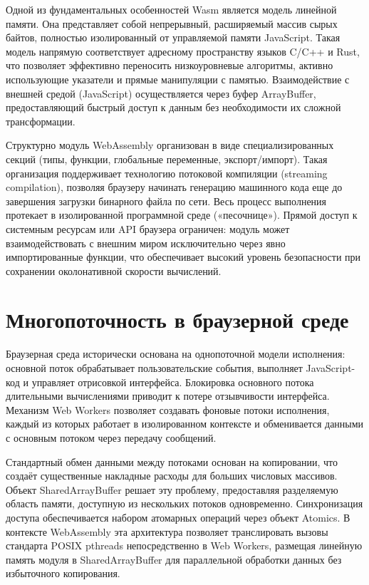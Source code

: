 \documentclass[12pt, oneside]{book}
\begin{document}
    \quad Одной из фундаментальных особенностей Wasm является модель линейной памяти. Она представляет собой непрерывный, расширяемый массив сырых байтов, полностью изолированный от управляемой памяти JavaScript. Такая модель напрямую соответствует адресному пространству языков C/C++ и Rust, что позволяет эффективно переносить низкоуровневые алгоритмы, активно использующие указатели и прямые манипуляции с памятью. Взаимодействие с внешней средой (JavaScript) осуществляется через буфер ArrayBuffer, предоставляющий быстрый доступ к данным без необходимости их сложной трансформации.
    
    \quad Структурно модуль WebAssembly организован в виде специализированных секций (типы, функции, глобальные переменные, экспорт/импорт). Такая организация поддерживает технологию потоковой компиляции (streaming compilation), позволяя браузеру начинать генерацию машинного кода еще до завершения загрузки бинарного файла по сети. Весь процесс выполнения протекает в изолированной программной среде («песочнице»). Прямой доступ к системным ресурсам или API браузера ограничен: модуль может взаимодействовать с внешним миром исключительно через явно импортированные функции, что обеспечивает высокий уровень безопасности при сохранении околонативной скорости вычислений.

\section{Многопоточность в браузерной среде}

    \quad Браузерная среда исторически основана на однопоточной модели исполнения: основной поток обрабатывает пользовательские события, выполняет JavaScript-код и управляет отрисовкой интерфейса. Блокировка основного потока длительными вычислениями приводит к потере отзывчивости интерфейса. Механизм Web Workers позволяет создавать фоновые потоки исполнения, каждый из которых работает в изолированном контексте и обменивается данными с основным потоком через передачу сообщений.

    \quad Стандартный обмен данными между потоками основан на копировании, что создаёт существенные накладные расходы для больших числовых массивов. Объект SharedArrayBuffer решает эту проблему, предоставляя разделяемую область памяти, доступную из нескольких потоков одновременно. Синхронизация доступа обеспечивается набором атомарных операций через объект Atomics. В контексте WebAssembly эта архитектура позволяет транслировать вызовы стандарта POSIX pthreads непосредственно в Web Workers, размещая линейную память модуля в SharedArrayBuffer для параллельной обработки данных без избыточного копирования.
\end{document}
